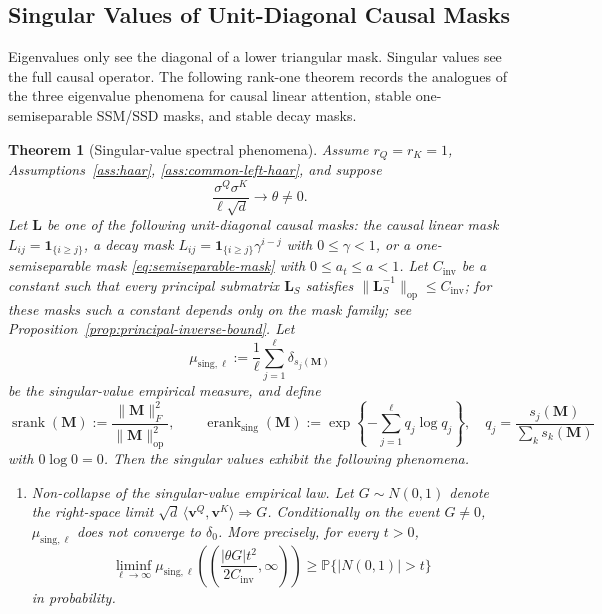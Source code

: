 \documentclass{article}
\newcommand{\Prob}{\mathbb{P}}
\newcommand{\srank}{\operatorname{srank}}
\newcommand{\erank}{\operatorname{erank}}
\newcommand{\op}{\operatorname{op}}
\newcommand{\weak}{\Rightarrow}
\newcommand{\one}{\mathbf{1}}
\newcommand{\bM}{\mathbf{M}}
\newcommand{\bL}{\mathbf{L}}
\newcommand{\bv}{\mathbf{v}}
\newtheorem{theorem}{Theorem}
\theoremstyle{remark}
\begin{document}
\subsection{Singular Values of Unit-Diagonal Causal Masks}

Eigenvalues only see the diagonal of a lower triangular mask.  Singular values
see the full causal operator.  The following rank-one theorem records the
analogues of the three eigenvalue phenomena for causal linear attention, stable
one-semiseparable SSM/SSD masks, and stable decay masks.

\begin{theorem}[Singular-value spectral phenomena]
Assume $r_Q=r_K=1$, Assumptions~\ref{ass:haar},
\ref{ass:common-left-haar}, and suppose
\[
    \frac{\sigma^Q\sigma^K}{\ell\sqrt d}\longrightarrow \theta\neq0.
\]
Let $\bL$ be one of the following unit-diagonal causal masks: the causal linear
mask $L_{ij}=\one_{\{i\geq j\}}$, a decay mask
$L_{ij}=\one_{\{i\geq j\}}\gamma^{i-j}$ with $0\leq\gamma<1$, or a
one-semiseparable mask \eqref{eq:semiseparable-mask} with
$0\leq a_t\leq a<1$.  Let $C_{\mathrm{inv}}$ be a constant such that every
principal submatrix $\bL_S$ satisfies
$\|\bL_S^{-1}\|_{\op}\leq C_{\mathrm{inv}}$; for these masks such a constant
depends only on the mask family; see
Proposition~\ref{prop:principal-inverse-bound}.  Let
\[
    \mu_{\mathrm{sing},\ell}
    :=
    \frac{1}{\ell}\sum_{j=1}^{\ell}\delta_{s_j(\bM)}
\]
be the singular-value empirical measure, and define
\[
    \srank(\bM):=\frac{\|\bM\|_F^2}{\|\bM\|_{\op}^2},
    \qquad
    \erank_{\mathrm{sing}}(\bM)
    :=
    \exp\left\{-\sum_{j=1}^{\ell}q_j\log q_j\right\},
    \quad
    q_j=\frac{s_j(\bM)}{\sum_k s_k(\bM)}
\]
with $0\log0=0$.  Then the singular values exhibit the following phenomena.

\begin{enumerate}
\item[(i)] Non-collapse of the singular-value empirical law.  Let
$G\sim N(0,1)$ denote the right-space limit
$\sqrt d\,\langle\bv^Q,\bv^K\rangle\weak G$.  Conditionally on the event
$G\neq0$, $\mu_{\mathrm{sing},\ell}$ does not converge to $\delta_0$.  More
precisely, for every $t>0$,
\begin{equation}
    \liminf_{\ell\to\infty}
    \mu_{\mathrm{sing},\ell}
    \left(
        \left(
        \frac{|\theta G|t^2}{2C_{\mathrm{inv}}},
        \infty
        \right)
    \right)
    \geq
    \Prob\{|N(0,1)|>t\}
    \label{eq:singular-noncollapse}
\end{equation}
in probability.


\end{enumerate}
\end{theorem}
\end{document}
